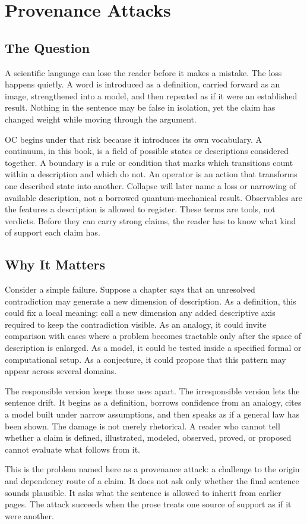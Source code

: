 \documentclass[11pt,a4paper,openany]{book}
\begin{document}
\section{Provenance Attacks}
\subsection{The Question}
A scientific language can lose the reader before it makes a mistake. The loss happens quietly. A word is introduced as a definition, carried forward as an image, strengthened into a model, and then repeated as if it were an established result. Nothing in the sentence may be false in isolation, yet the claim has changed weight while moving through the argument. \cite{goldenfeld_lectures,kadanoff_scaling}\par
OC begins under that risk because it introduces its own vocabulary. A continuum, in this book, is a field of possible states or descriptions considered together. A boundary is a rule or condition that marks which transitions count within a description and which do not. An operator is an action that transforms one described state into another. Collapse will later name a loss or narrowing of available description, not a borrowed quantum-mechanical result. Observables are the features a description is allowed to register. These terms are tools, not verdicts. Before they can carry strong claims, the reader has to know what kind of support each claim has.\par
\subsection{Why It Matters}
Consider a simple failure. Suppose a chapter says that an unresolved contradiction may generate a new dimension of description. As a definition, this could fix a local meaning: call a new dimension any added descriptive axis required to keep the contradiction visible. As an analogy, it could invite comparison with cases where a problem becomes tractable only after the space of description is enlarged. As a model, it could be tested inside a specified formal or computational setup. As a conjecture, it could propose that this pattern may appear across several domains. \cite{goldenfeld_lectures,kadanoff_scaling}\par
The responsible version keeps those uses apart. The irresponsible version lets the sentence drift. It begins as a definition, borrows confidence from an analogy, cites a model built under narrow assumptions, and then speaks as if a general law has been shown. The damage is not merely rhetorical. A reader who cannot tell whether a claim is defined, illustrated, modeled, observed, proved, or proposed cannot evaluate what follows from it.\par
This is the problem named here as a provenance attack: a challenge to the origin and dependency route of a claim. It does not ask only whether the final sentence sounds plausible. It asks what the sentence is allowed to inherit from earlier pages. The attack succeeds when the prose treats one source of support as if it were another.\par
\end{document}
